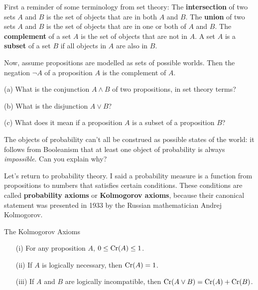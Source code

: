 \begin{exercise2}
  First a reminder of some terminology from set theory: 
  The \textbf{intersection} of two sets $A$ and $B$ is the set of
  objects that are in both $A$ and $B$. The \textbf{union} of two sets
  $A$ and $B$ is the set of objects that are in one or both of $A$ and
  $B$. The \textbf{complement} of a set $A$ is the set of objects that
  are not in $A$. A set $A$ is a \textbf{subset} of a set $B$ if all
  objects in $A$ are also in $B$.

  Now, assume propositions are modelled as sets of possible
  worlds. Then the negation $\neg A$ of a proposition $A$ is the
  complement of $A$.
  \begin{exlist}
  \item[(a)] What is the conjunction $A \land B$ of two propositions,
    in set theory terms?
  \item[(b)] What is the disjunction $A \lor B$?
  \item[(c)] What does it mean if a proposition $A$ is a subset of a proposition $B$?
  \end{exlist}
\end{exercise2}

\begin{exercise2}
  The objects of probability can't all be construed as possible states
  of the world: it follows from Booleanism that at least one object of
  probability is always \emph{impossible}. Can you explain why?
\end{exercise2}
  

Let's return to probability theory. I said a probability measure is a
function from propositions to numbers that satisfies certain
conditions.  These conditions are called \textbf{probability
  axioms} or \textbf{Kolmogorov axioms}, because their canonical
statement was presented in 1933 by the Russian mathematician Andrej Kolmogorov.
\begin{genericthm}{The Kolmogorov Axioms}
  \leavevmode\vspace{-2em}
  \begin{itemize}
  \itemsep0em 
  \item[(i)] For any proposition $A$, $0 \leq \text{Cr}(A) \leq 1$.
  \item[(ii)] If $A$ is logically necessary, then $\text{Cr}(A) = 1$.
  \item[(iii)] If $A$ and $B$ are logically incompatible, then $\text{Cr}(A \lor B) = \text{Cr}(A) + \text{Cr}(B)$.
  \end{itemize}
\end{genericthm}

